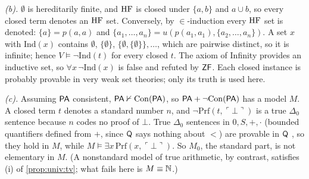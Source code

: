 \emph{(b).} $\emptyset$ is hereditarily finite, and $\mathrm{HF}$ is closed under $\{a,b\}$ and $a\cup b$, so every closed term denotes an $\mathrm{HF}$ set. Conversely, by $\in$-induction every $\mathrm{HF}$ set is denoted: $\{a\}=p(a,a)$ and $\{a_1,\dots,a_n\}=u(p(a_1,a_1),\{a_2,\dots,a_n\})$. A set $x$ with $\mathrm{Ind}(x)$ contains $\emptyset$, $\{\emptyset\}$, $\{\emptyset,\{\emptyset\}\},\dots$, which are pairwise distinct, so it is infinite; hence $V\models\neg\mathrm{Ind}(t)$ for every closed $t$. The axiom of Infinity provides an inductive set, so $\forall x\,\neg\mathrm{Ind}(x)$ is false and refuted by $\mathsf{ZF}$. Each closed instance is probably provable in very weak set theories; only its truth is used here.

\emph{(c).} Assuming $\mathsf{PA}$ consistent, $\mathsf{PA}\nvdash\mathrm{Con}(\mathsf{PA})$, so $\mathsf{PA}+\neg\mathrm{Con}(\mathsf{PA})$ has a model $M$. A closed term $t$ denotes a standard number $n$, and $\neg\mathrm{Prf}(t,\ulcorner\bot\urcorner)$ is a true $\Delta_0$ sentence because $n$ codes no proof of $\bot$. True $\Delta_0$ sentences in $0,S,+,\cdot$ (bounded quantifiers defined from $+$, since $\mathsf{Q}$ says nothing about $<$) are provable in $\mathsf{Q}$ \citep[see e.g.][]{hajek1993metamathematics}, so they hold in $M$, while $M\models\exists x\,\mathrm{Prf}(x,\ulcorner\bot\urcorner)$. So $M_0$, the standard part, is not elementary in $M$. (A nonstandard model of true arithmetic, by contrast, satisfies (i) of \cref{prop:univ:tv}; what fails here is $M\equiv\mathbb{N}$.)

